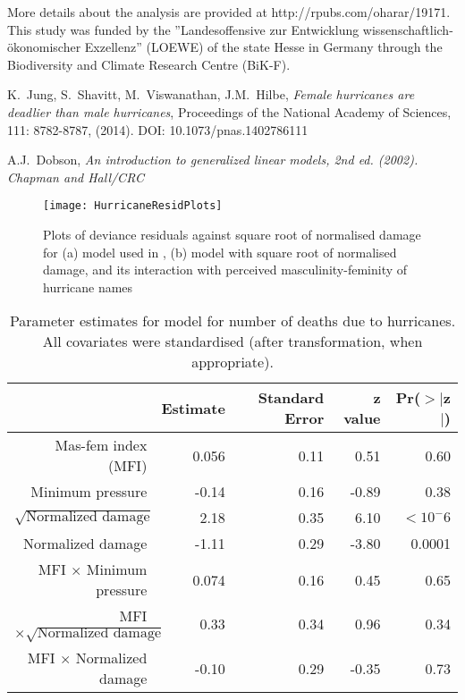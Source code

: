 \documentclass{pnastwo}\usepackage[]{graphicx}\usepackage[]{color}
\begin{document}
\begin{article}
\begin{acknowledgments}
More details about the analysis are provided at http://rpubs.com/oharar/19171. This study was funded by the ''Landesoffensive zur Entwicklung wissenschaftlich-\"{o}konomischer Exzellenz'' (LOEWE) of the state Hesse in Germany through the Biodiversity and Climate Research Centre (BiK-F).\end{acknowledgments}

\begin{thebibliography}{10}
K.~Jung, S.~Shavitt, M.~Viswanathan, J.M.~Hilbe, {\em Female hurricanes are 
deadlier than male hurricanes}, Proceedings of the National Academy of Sciences, 111: 8782-8787, (2014). DOI: 10.1073/pnas.1402786111

A.J.~Dobson, \em{An introduction to generalized linear models, 2nd ed.} (2002). Chapman and Hall/CRC

\end{thebibliography}

\end{article}

\begin{figure}
\caption{Plots of deviance residuals against square root of normalised damage for (a) model used in \cite{1}, (b) model with square root of normalised damage, and its interaction with perceived masculinity-feminity of hurricane names}
\label{fig:residplots}
{\centering \texttt{[image: HurricaneResidPlots]} }
\end{figure}

\begin{table}[ht]
\centering
\caption{Parameter estimates for model for number of deaths due to hurricanes. All covariates were standardised (after transformation, when appropriate).}
\label{tab:ParEsts}
\begin{tabular}{rrrrr}
  \hline
 & Estimate & Standard Error & z value & Pr($>$$|$z$|$) \\ 
  \hline
  Mas-fem index (MFI) & 0.056 & 0.11 & 0.51 & 0.60 \\ 
  Minimum pressure & -0.14 & 0.16 & -0.89 & 0.38 \\ 
  $\sqrt{\mbox{Normalized damage}}$ & 2.18 & 0.35 & 6.10 & $<10^-6$ \\ 
  Normalized damage & -1.11 & 0.29 & -3.80 & 0.0001 \\ 
  MFI $\times$ Minimum pressure & 0.074 & 0.16 & 0.45 & 0.65 \\ 
  MFI $\times \sqrt{\mbox{Normalized damage}}$ & 0.33 & 0.34 & 0.96 & 0.34 \\ 
  MFI $\times$ Normalized damage & -0.10 & 0.29 & -0.35 & 0.73 \\ 
   \hline
\end{tabular}
\end{table}
\end{document}
